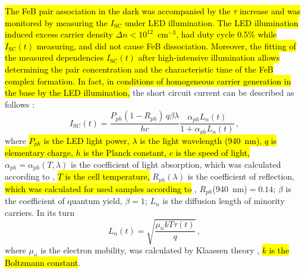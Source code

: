 \documentclass[sn-mathphys]{sn-jnl}%
\theoremstyle{thmstyleone}%
\theoremstyle{thmstyletwo}%
\theoremstyle{thmstylethree}%
\begin{document}
\hl{The FeB pair association in the dark was accompanied by the $\tau$ increase and
was monitored by measuring the $I_\mathrm{SC}$ under LED illumination.
The LED illumination induced excess carrier density $\Delta n<10^{12}$~cm$^{-3}$,
had duty cycle 0.5\% while $I_\mathrm{SC}(t)$ measuring,
and did not cause FeB dissociation.
Moreover, the fitting of the measured dependencies $I_\mathrm{SC}(t)$ after high-intensive illumination
allows determining  the pair concentration and the characteristic time of the FeB complex formation.
In fact, in conditions of homogeneous carrier generation in the base  by the LED illumination,}
the short circuit current can be described as follows \cite{Bube,Razeghi}:
\begin{equation}
\label{eqIsc}
I_\mathrm{SC}(t)=\frac{P_{ph}(1-R_{ph})\,q\beta\lambda}{hc}\frac{\alpha_{ph}L_n(t)}{1+\alpha_{ph}L_n(t)}\,,
\end{equation}
where
\hl{$P_{ph}$ is the LED light power,
$\lambda$ is the light wavelength (940~nm),
$q$ is elementary charge,
$h$ is the Planck constant,
$c$ is the speed of light,}
$\alpha_{ph}=\alpha_{ph}(T,\lambda)$ is the coefficient of light absorption,
which was calculated according to \cite{Si:Absorb,GreenOptic},
\hl{$T$ is the cell temperature,}
$R_{ph}(\lambda)$ is the coefficient of reflection,
\hl{which was calculated for used samples according to} \cite{KostRefl2000,KostRefl2000A}, $R_{ph}$(940~nm)$=0.14$;
$\beta$ is the coefficient of quantum  yield, $\beta=1$;
$L_n$  is the diffusion length of minority carriers.
In its turn
\begin{equation}
\label{eqLn}
L_n(t)=\sqrt{\frac{\mu_nkT\tau(t)}{q}}\,,
\end{equation}
where
$\mu_n$ is the electron mobility, was calculated by Klaassen theory \cite{KLAASSEN953},
\hl{$k$ is the Boltzmann constant}.
\end{document}

